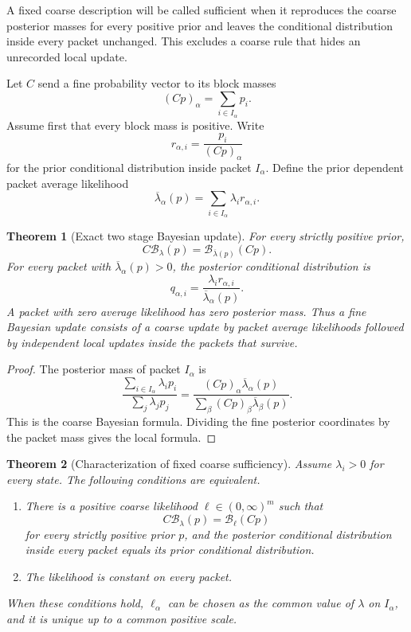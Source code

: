 \documentclass[11pt,a4paper]{article}
\newtheorem{theorem}{Theorem}[section]
\theoremstyle{definition}
\theoremstyle{remark}
\newcommand{\Bcal}{\mathcal B}
\begin{document}
A fixed coarse description will be called sufficient when it reproduces the coarse posterior masses for every positive prior and leaves the conditional distribution inside every packet unchanged. This excludes a coarse rule that hides an unrecorded local update.

Let \(C\) send a fine probability vector to its block masses
\[
(Cp)_\alpha
=
\sum_{i\in I_\alpha}p_i.
\]
Assume first that every block mass is positive. Write
\[
r_{\alpha,i}
=
\frac{p_i}{(Cp)_\alpha}
\]
for the prior conditional distribution inside packet \(I_\alpha\). Define the prior dependent packet average likelihood
\[
\overline\lambda_\alpha(p)
=
\sum_{i\in I_\alpha}\lambda_ir_{\alpha,i}.
\]

\begin{theorem}[Exact two stage Bayesian update]\label{extended:record:049}\label{extended:thm:two_stage_bayes}
For every strictly positive prior,
\[
C\Bcal_\lambda(p)
=
\Bcal_{\overline\lambda(p)}(Cp).
\]
For every packet with \(\overline\lambda_\alpha(p)>0\), the posterior conditional distribution is
\[
q_{\alpha,i}
=
\frac{\lambda_ir_{\alpha,i}}
{\overline\lambda_\alpha(p)}.
\]
A packet with zero average likelihood has zero posterior mass. Thus a fine Bayesian update consists of a coarse update by packet average likelihoods followed by independent local updates inside the packets that survive.
\end{theorem}

\begin{proof}
The posterior mass of packet \(I_\alpha\) is
\[
\frac{\sum_{i\in I_\alpha}\lambda_ip_i}
{\sum_j\lambda_jp_j}
=
\frac{(Cp)_\alpha\overline\lambda_\alpha(p)}
{\sum_\beta(Cp)_\beta\overline\lambda_\beta(p)}.
\]
This is the coarse Bayesian formula. Dividing the fine posterior coordinates by the packet mass gives the local formula.
\end{proof}

\begin{theorem}[Characterization of fixed coarse sufficiency]\label{extended:record:050}\label{extended:thm:bayesian_sufficiency}
Assume \(\lambda_i>0\) for every state. The following conditions are equivalent.
\begin{enumerate}
\item There is a positive coarse likelihood \(\ell\in(0,\infty)^m\) such that
\[
C\Bcal_\lambda(p)
=
\Bcal_\ell(Cp)
\]
for every strictly positive prior \(p\), and the posterior conditional distribution inside every packet equals its prior conditional distribution.
\item The likelihood is constant on every packet.
\end{enumerate}
When these conditions hold, \(\ell_\alpha\) can be chosen as the common value of \(\lambda\) on \(I_\alpha\), and it is unique up to a common positive scale.
\end{theorem}
\end{document}
